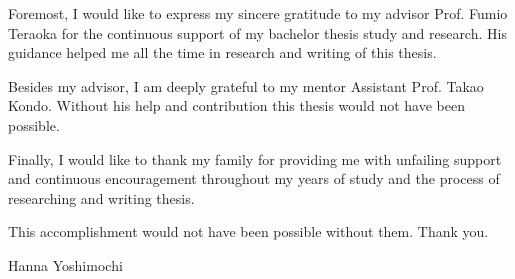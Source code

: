 Foremost, I would like to express my sincere gratitude to my advisor Prof. Fumio Teraoka for the continuous support of my bachelor thesis study and research. His guidance helped me all the time in research and writing of this thesis. 

Besides my advisor, I am deeply grateful to my mentor Assistant Prof. Takao Kondo. Without his help and contribution this thesis would not have been possible.

Finally, I would like to thank my family for providing me with unfailing support and continuous encouragement throughout my years of study and the process of researching and writing thesis. 

This accomplishment would not have been possible without them. Thank you. 

Hanna Yoshimochi



